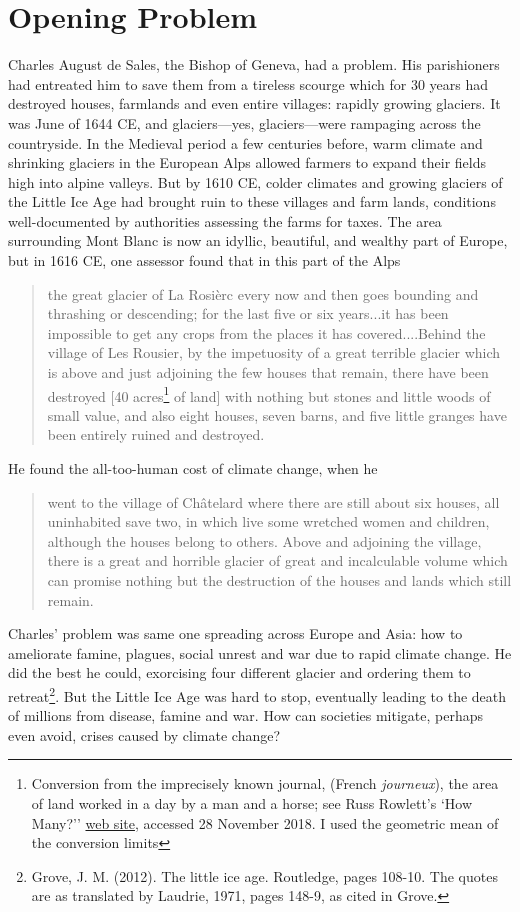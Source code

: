 \documentclass[amstex,12pt]{book}
\begin{document}
\section{Opening Problem} \label{Opening Problem}
Charles August de Sales, the Bishop of Geneva, had a problem. His parishioners had entreated him to save them from a tireless scourge which for 30 years had destroyed houses, farmlands and even entire villages: rapidly growing glaciers. It was June of 1644 CE, and glaciers---yes, glaciers---were rampaging across the countryside. In the Medieval period a few centuries before, warm climate and shrinking glaciers in the European Alps allowed farmers to expand their fields high into alpine valleys. But by 1610 CE, colder climates and growing glaciers of the Little Ice Age had brought ruin to these villages and farm lands, conditions well-documented by authorities assessing the farms for taxes. The area surrounding Mont Blanc is now an idyllic, beautiful, and wealthy part of Europe, but in 1616 CE, one assessor found that in this part of the Alps 
\begin{quotation}
the great glacier of La Rosi\`erc every now and then goes bounding and thrashing or descending; for the last five or six years...it has been impossible to get any crops from the places it has covered....Behind the village of Les Rousier, by the impetuosity of a great terrible glacier which is above and just adjoining the few houses that remain, there have been destroyed [40 acres\footnote{Conversion from the imprecisely known journal, (French \textit{journeux}), the area of land worked in a day by a man and a horse; see Russ Rowlett's `How Many?'' \href{http://www.ibiblio.org/units/dictJ.html}{web site}, accessed 28 November 2018. I used the geometric mean of the conversion limits} of land] with nothing but stones and little woods of small value, and also eight houses, seven barns, and five little granges have been entirely ruined and destroyed.
\end{quotation}
He found the all-too-human cost of climate change, when he
\begin{quotation} 
went to the village of Ch\^atelard where there are still about six houses, all uninhabited save two, in which live some wretched women and children, although the houses belong to others. Above and adjoining the village, there is a great and horrible glacier of great and incalculable volume which can promise nothing but the destruction of the houses and lands which still remain.
\end{quotation}
Charles' problem was same one spreading across Europe and Asia: how to ameliorate famine, plagues, social unrest and war due to rapid climate change. He did the best he could, exorcising four different glacier and ordering them to retreat\footnote{Grove, J. M. (2012). The little ice age. Routledge, pages 108-10. The quotes are as translated by Laudrie, 1971, pages 148-9, as cited in Grove.}. But the Little Ice Age was hard to stop, eventually leading to the death of millions from disease, famine and war. How can societies mitigate, perhaps even avoid, crises caused by climate change?
\end{document}
